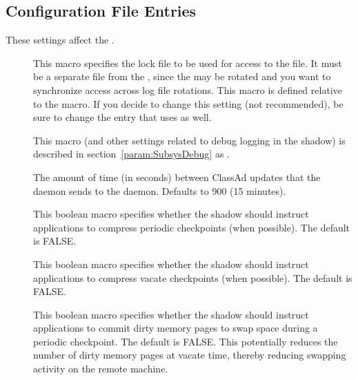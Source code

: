 \subsection{\label{sec:Shadow-Config-File-Entries}
Configuration File Entries}

These settings affect the .
\begin{description}

\item[] \label{param:ShadowLock} This macro
  specifies the lock file to be used for access to the
   file.  It must be a separate file from the
  , since the  may be rotated 
  and you want to synchronize access across log file rotations.
  This macro is defined relative to the  macro.
  If you decide to change this setting (not recommended),
  be sure to change the  entry that
   uses as well.

\item[] \label{param:ShadowDebug} This macro
  (and other settings related to debug logging in the shadow) is
  described in section~\ref{param:SubsysDebug} as
  .

\item[]
\label{param:ShadowQueueUpdateInterval}
The amount of time (in seconds) between ClassAd updates that the
 daemon sends to the  daemon.
Defaults to 900 (15 minutes).

\item[]
  \label{param:CompressPeriodicCkpt} This boolean macro specifies
  whether the shadow should instruct applications to compress periodic
  checkpoints (when possible).  The default is FALSE.

\item[]
  \label{param:CompressVacateCkpt} This boolean macro specifies
  whether the shadow should instruct applications to compress vacate
  checkpoints (when possible).  The default is FALSE.

\item[] \label{param:PeriodicMemorySync}
  This boolean macro specifies whether the shadow should instruct
  applications to commit dirty memory pages to swap space during a
  periodic checkpoint.  The default is FALSE.  This potentially
  reduces the number of dirty memory pages at vacate time, thereby
  reducing swapping activity on the remote machine.


\end{description}
